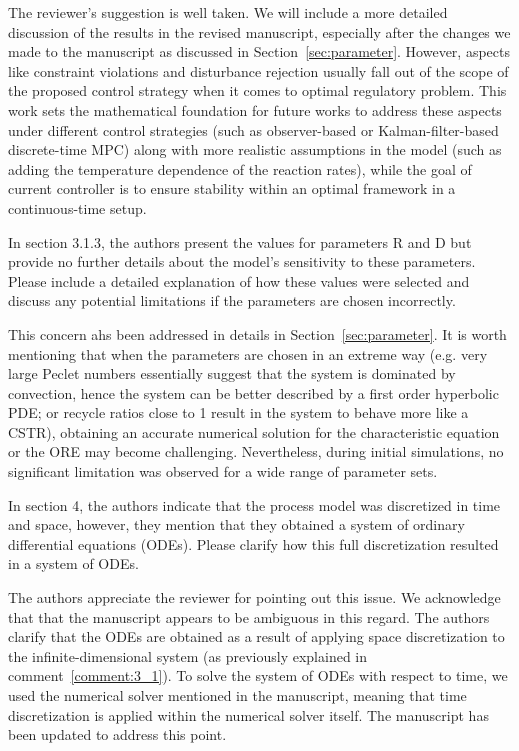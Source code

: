 \documentclass[12pt,answers]{exam}
\begin{document}
\begin{questions}
    \begin{solutionorbox} \label{comment:}
        The reviewer's suggestion is well taken. We will include a more detailed discussion of the results in the revised manuscript, especially after the changes we made to the manuscript as discussed in Section~\ref{sec:parameter}. However, aspects like constraint violations and disturbance rejection usually fall out of the scope of the proposed control strategy when it comes to optimal regulatory problem. This work sets the mathematical foundation for future works to address these aspects under different control strategies (such as observer-based or Kalman-filter-based discrete-time MPC) along with more realistic assumptions in the model (such as adding the temperature dependence of the reaction rates), while the goal of current controller is to ensure stability within an optimal framework in a continuous-time setup.
    \end{solutionorbox}


    \question In section 3.1.3, the authors present the values for parameters R and D but provide no further details about the model's sensitivity to these parameters. Please include a detailed explanation of how these values were selected and discuss any potential limitations if the parameters are chosen incorrectly.

    \begin{solutionorbox} \label{comment:}
        This concern ahs been addressed in details in Section~\ref{sec:parameter}. It is worth mentioning that when the parameters are chosen in an extreme way (e.g. very large Peclet numbers essentially suggest that the system is dominated by convection, hence the system can be better described by a first order hyperbolic PDE; or recycle ratios close to 1 result in the system to behave more like a CSTR), obtaining an accurate numerical solution for the characteristic equation or the ORE may become challenging. Nevertheless, 
        during initial simulations, no significant limitation was observed for a wide range of parameter sets.
    \end{solutionorbox}


    \question In section 4, the authors indicate that the process model was discretized in time and space, however, they mention that they obtained a system of ordinary differential equations (ODEs). Please clarify how this full discretization resulted in a system of ODEs.

    \begin{solutionorbox} \label{comment:}
        The authors appreciate the reviewer for pointing out this issue. We acknowledge that that the manuscript appears to be ambiguous in this regard. The authors clarify that the ODEs are obtained as a result of applying space discretization to the infinite-dimensional system (as previously explained in comment~\ref{comment:3_1}). To solve the system of ODEs with respect to time, we used the numerical solver mentioned in the manuscript, meaning that time discretization is applied within the numerical solver itself. The manuscript has been updated to address this point.
    \end{solutionorbox}



\end{questions}
\end{document}
